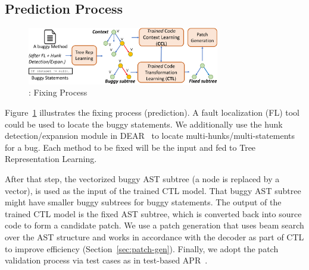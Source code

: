 \subsection{Prediction Process}

\begin{figure}[t]
	\centering
	\includegraphics[width=3.3in]{graphs/overview-predict-5.png}
	\caption{{\tool}: Fixing Process}
        \vspace{-3pt}
	\label{overview-fixing}
\end{figure}

Figure~\ref{overview-fixing} illustrates the fixing process
(prediction). A fault localization (FL) tool could be used to locate
the buggy statements. We additionally use the hunk detection/expansion
module in DEAR~\cite{icse22} to locate multi-hunks/multi-statements
for a bug. Each method to be fixed will be the input and fed to Tree
Representation Learning.
%

After that step, the vectorized buggy AST subtree (a node is replaced
by a vector), is used as the input of the trained CTL model. That buggy
AST subtree might have smaller buggy subtrees for buggy statements.
The output of the trained CTL model is the fixed AST subtree, which is
converted back into source code to form a candidate patch. We use a
patch generation that uses beam search over the AST structure and
works in accordance with the decoder as part of CTL to improve
efficiency (Section~\ref{sec:patch-gen}). Finally, we adopt the patch
validation process via test cases as in test-based APR~\cite{icse20}.





